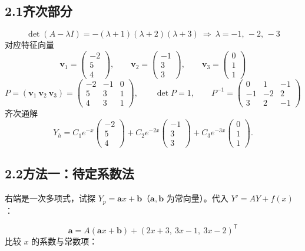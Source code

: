 \documentclass[11pt]{ctexart}
\newcommand{\vect}[1]{\boldsymbol{#1}}
\begin{document}
\subsection*{2.1\quad 齐次部分}

\[
\det(A-\lambda I)=-(\lambda+1)(\lambda+2)(\lambda+3)\ \Longrightarrow\ \lambda=-1,\,-2,\,-3
\]
对应特征向量
\[
\vect{v}_1=\begin{pmatrix}-2\\5\\4\end{pmatrix},\qquad
\vect{v}_2=\begin{pmatrix}-1\\3\\3\end{pmatrix},\qquad
\vect{v}_3=\begin{pmatrix}0\\1\\1\end{pmatrix}
\]
\[
P=(\vect{v}_1\ \vect{v}_2\ \vect{v}_3)=
\begin{pmatrix}-2&-1&0\\ 5&3&1\\ 4&3&1\end{pmatrix},
\qquad \det P=1,\qquad
P^{-1}=\begin{pmatrix}0&1&-1\\ -1&-2&2\\ 3&2&-1\end{pmatrix}
\]
齐次通解
\[
Y_h=C_1e^{-x}\begin{pmatrix}-2\\5\\4\end{pmatrix}
   +C_2e^{-2x}\begin{pmatrix}-1\\3\\3\end{pmatrix}
   +C_3e^{-3x}\begin{pmatrix}0\\1\\1\end{pmatrix}.
\]

\subsection*{2.2\quad 方法一：待定系数法}

右端是一次多项式，试探 $Y_p=\vect{a}x+\vect{b}$（$\vect a,\vect b$ 为常向量）。代入 $Y'=AY+f(x)$：

\[
\vect a=A(\vect a x+\vect b)+\left(2x+3,\ 3x-1,\ 3x-2\right)^{\mathsf T}
\]
比较 $x$ 的系数与常数项：
\end{document}
